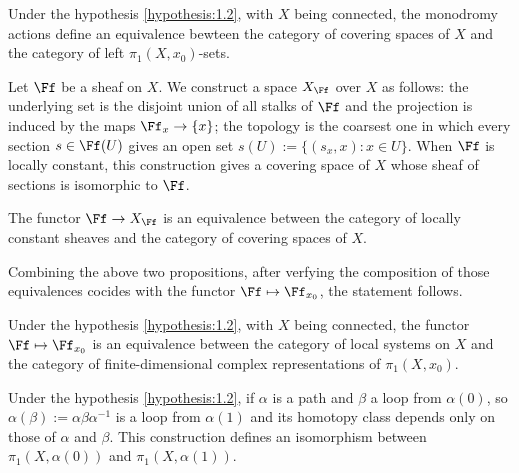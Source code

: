 \begin{subproposition}
  Under the hypothesis \ref{hypothesis:1.2}, with $X$ being connected,
  the monodromy actions define an equivalence bewteen
  the category of covering spaces of $X$ and
  the category of left $\pi_1(X,x_0)$-sets.
\end{subproposition}

\begin{subpara}
  Let $\Ff$ be a sheaf on $X$. We construct a space $X_{\Ff}$ over $X$
  as follows:
  the underlying set is the disjoint union of all stalks of $\Ff$ and
  the projection is induced by the maps $\Ff_x\to\{x\}$;
  the topology is the coarsest one in which every section $s\in\Ff(U)$ gives
  an open set $s(U):=\{(s_x,x):x\in U\}$.
  When $\Ff$ is locally constant, this construction gives a covering space of
  $X$ whose sheaf of sections is isomorphic to $\Ff$.
\end{subpara}

\begin{subproposition}
  The functor $\Ff\to X_{\Ff}$ is an equivalence between
  the category of locally constant sheaves and
  the category of covering spaces of $X$.
\end{subproposition}

Combining the above two propositions, after verfying the composition of those
equivalences cocides with the functor $\Ff\mapsto\Ff_{x_0}$, the statement
follows.

\begin{corollary}\label{cor:1.4}
  Under the hypothesis \ref{hypothesis:1.2}, with $X$ being connected,
  the functor $\Ff\mapsto\Ff_{x_0}$ is an equivalence between
  the category of local systems on $X$ and
  the category of finite-dimensional complex representations of $\pi_1(X,x_0)$.
\end{corollary}

\begin{para}\label{hypothesis:1.5}
  Under the hypothesis \ref{hypothesis:1.2}, if $\alpha$ is a path and $\beta$
  a loop from $\alpha(0)$, so $\alpha(\beta):=\alpha\beta\alpha^{-1}$ is a loop
  from $\alpha(1)$ and its homotopy class depends only on those of $\alpha$ and
  $\beta$. This construction defines an isomorphism between $\pi_1(X,\alpha(0))$
  and $\pi_1(X,\alpha(1))$.
\end{para}

